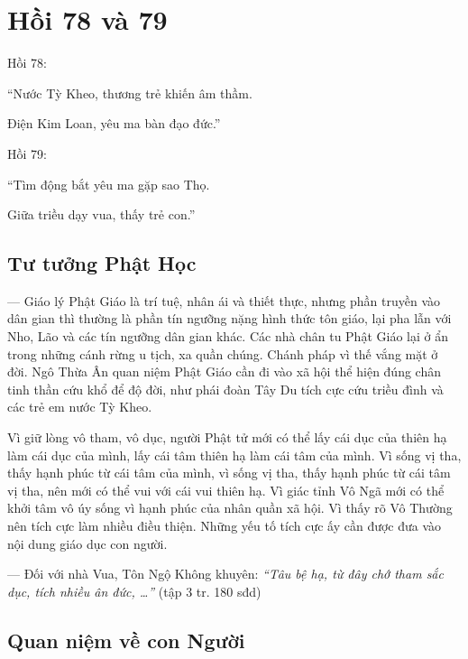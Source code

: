 \chapter{Hồi 78 và 79} %
\label{cha:hoi_78_79}

Hồi 78:

\begin{itshape}
``Nước Tỳ Kheo, thương trẻ khiến âm thầm.

Điện Kim Loan, yêu ma bàn đạo đức.''
\end{itshape}

Hồi 79:

\begin{itshape}
``Tìm động bắt yêu ma gặp sao Thọ.

Giữa triều dạy vua, thấy trẻ con.''
\end{itshape}

\section{Tư tưởng Phật Học} %
\label{sec:78_79_phat_hoc}

— Giáo lý Phật Giáo là trí tuệ, nhân ái và thiết thực, nhưng phần truyền vào dân gian thì thường là phần tín ngưỡng nặng hình thức tôn giáo, lại pha lẫn với Nho, Lão và các tín ngưỡng dân gian khác. Các nhà chân tu Phật Giáo lại ở ẩn trong những cánh rừng u tịch, xa quần chúng. Chánh pháp vì thế vắng mặt ở đời. Ngô Thừa Ân quan niệm Phật Giáo cần đi vào xã hội thể hiện đúng chân tinh thần cứu khổ để độ đời, như phái đoàn Tây Du tích cực cứu triều đình và các trẻ em nước Tỳ Kheo.

Vì giữ lòng vô tham, vô dục, người Phật tử mới có thể lấy cái dục của thiên hạ làm cái dục của mình, lấy cái tâm thiên hạ làm cái tâm của mình. Vì sống vị tha, thấy hạnh phúc từ cái tâm của mình, vì sống vị tha, thấy hạnh phúc từ cái tâm vị tha, nên mới có thể vui với cái vui thiên hạ. Vì giác tỉnh Vô Ngã mới có thể khởi tâm vô úy sống vì hạnh phúc của nhân quần xã hội. Vì thấy rõ Vô Thường nên tích cực làm nhiều điều thiện. Những yếu tố tích cực ấy cần được đưa vào nội dung giáo dục con người.

— Đối với nhà Vua, Tôn Ngộ Không khuyên: \emph{``Tâu bệ hạ, từ đây chớ tham sắc dục, tích nhiều ân đức, \ldots''} (tập 3 tr. 180 sđd)

\section{Quan niệm về con Người} %
\label{sec:78_79_con_nguoi}

